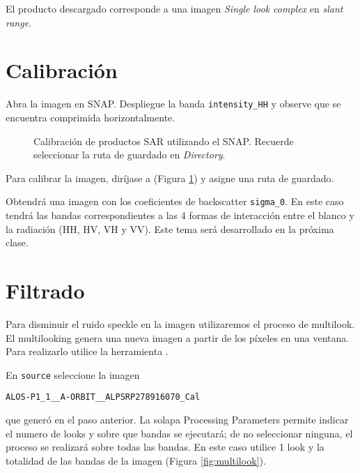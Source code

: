 El producto descargado corresponde a una imagen \emph{Single look complex} en \emph{slant range}.

\section{Calibración}

Abra la imagen  en SNAP. Despliegue la banda \texttt{intensity\_HH} y observe que se encuentra comprimida horizontalmente.

\begin{figure}[h!]
    \centering
    \hspace{1cm}
    \caption{Calibración de productos SAR utilizando el SNAP. Recuerde seleccionar la ruta de guardado en \emph{Directory}.} %
    \label{fig:calibrar}
\end{figure}

Para calibrar la imagen, diríjase a  (Figura \ref{fig:calibrar}) y asigne una ruta de guardado.

 Obtendrá una imagen con los coeficientes de backscatter \texttt{sigma\_0}. En este caso tendrá las bandas correspondientes a las 4 formas de interacción entre el blanco y la radiación (HH, HV, VH y VV). Este tema será desarrollado en la próxima clase.

 \section{Filtrado}

 Para disminuir el ruido speckle en la imagen utilizaremos el proceso de multilook. El multilooking genera una nueva imagen a partir de los píxeles en una ventana. Para realizarlo utilice la herramienta .

 En \texttt{source} seleccione la imagen
 \begin{center} \texttt{ALOS-P1\_1\_\_A-ORBIT\_\_ALPSRP278916070\_Cal} \end{center}
 que generó en el paso anterior. La solapa Processing Parameters permite indicar el numero de looks y sobre que bandas se ejecutará; de no seleccionar ninguna, el proceso se realizará sobre todas las bandas. En este caso utilice 1 look y la totalidad de las bandas de la imagen (Figura \ref{fig:multilook}).

